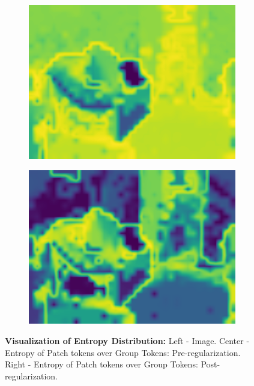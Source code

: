 \begin{figure}[t]
\begin{subfigure}{0.3\textwidth}
    \includegraphics[width=\linewidth]{figures/experiments/entropymaps/finetuned/10/entropy_mapwithoutcb.png}
\end{subfigure}
\begin{subfigure}{0.3\textwidth}
    \centering
    \includegraphics[width=\linewidth]{figures/experiments/entropymaps/er/10/entropy_mapwithoutcb.png}
\end{subfigure}
\caption[\textbf{Visualization of Entropy Distribution}]{\textbf{Visualization of Entropy Distribution:} Left - Image. Center - Entropy of Patch tokens over Group Tokens: Pre-regularization. Right - Entropy of Patch tokens over Group Tokens: Post-regularization.}
\label{fig:groupser}
\end{figure}

